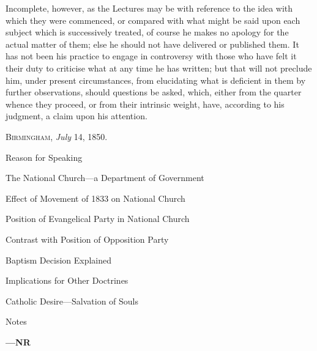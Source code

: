 Incomplete, however, as the Lectures may be with reference to the
idea with which they were commenced, or compared with what might be
said upon each subject which is successively treated, of course he
makes no apology for the actual matter of them; else he should not
have delivered or published them. It has not been his practice to
engage in controversy with those who have felt it their duty to
criticise what at any time he has written; but that will not preclude
him, under present circumstances, from elucidating what is deficient
in them by further observations, should questions be asked, which,
either from the quarter whence they proceed, or from their intrinsic
weight, have, according to his judgment, a claim upon his attention.


B\textsc{irmingham}, \emph{July} 14, 1850.


Reason for Speaking

The National Church—a Department of
Government

Effect of Movement of 1833 on National Church

Position of Evangelical Party in National
Church

Contrast with Position of Opposition Party

Baptism Decision Explained

Implications for Other Doctrines

Catholic Desire—Salvation of Souls

Notes

\textbf{—NR}

